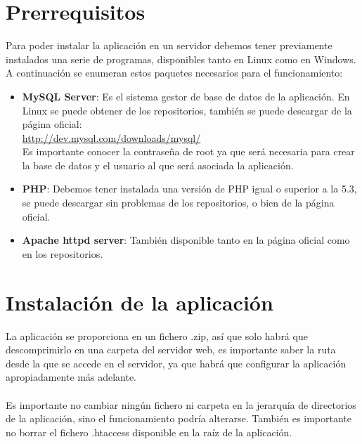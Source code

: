 \section{Prerrequisitos}

Para poder instalar la aplicación en un servidor debemos tener previamente instalados una serie de programas, disponibles tanto en Linux como en Windows. A continuación se enumeran estos paquetes necesarios para el funcionamiento:

\begin{itemize}

\item {\bf MySQL Server}: Es el sistema gestor de base de datos de la aplicación. En Linux se puede obtener de los repositorios, también se puede descargar de la página oficial:\\
\href{http://dev.mysql.com/downloads/mysql/}{http://dev.mysql.com/downloads/mysql/}\\
Es importante conocer la contraseña de root ya que será necesaria para crear la base de datos y el usuario al que será asociada la aplicación.
\item {\bf PHP}: Debemos tener instalada una versión de PHP igual o superior a la 5.3, se puede descargar sin problemas de los repositorios, o bien de la página oficial.
\item {\bf Apache httpd server}: También disponible tanto en la página oficial como en los repositorios.
\end{itemize}

\section{Instalación de la aplicación}
La aplicación se proporciona en un fichero .zip, así que solo habrá que descomprimirlo en una carpeta del servidor web, es importante saber la ruta desde la que se accede en el servidor, ya que habrá que configurar la aplicación apropiadamente más adelante.
\paragraph{}
Es importante no cambiar ningún fichero ni carpeta en la jerarquía de directorios de la aplicación, sino el funcionamiento podría alterarse. También es importante no borrar el fichero .htaccess disponible en la raíz de la aplicación.

